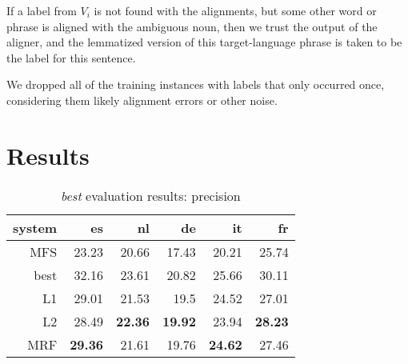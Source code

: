\documentclass[11pt,letterpaper]{article}
\begin{document}
If a label from $V_i$ is not found with the alignments, but some other word or
phrase is aligned with the ambiguous noun, then we trust the output of the
aligner, and the lemmatized version of this target-language phrase is taken to
be the label for this sentence.

We dropped all of the training instances with labels that only occurred once,
considering them likely alignment errors or other noise.


\section{Results}
\begin{table}[t!]
  \begin{center}
    \begin{tabular}{|r|r|r|r|r|r|}
      \hline
      system   & es    & nl    & de    &  it   & fr \\
      \hline
   MFS  & 23.23          & 20.66          & 17.43          & 20.21          & 25.74 \\
   best & 32.16          & 23.61          & 20.82          & 25.66          & 30.11 \\
      \hline
            L1 & 29.01          & 21.53          & 19.5           & 24.52          & 27.01 \\
            L2 & 28.49          & \textbf{22.36} & \textbf{19.92} & 23.94          & \textbf{28.23} \\
           MRF & \textbf{29.36} & 21.61          & 19.76          & \textbf{24.62} & 27.46 \\
      \hline
    \end{tabular}
  \caption{\emph{best} evaluation results: precision}
  \label{table:resultsbest}
  \end{center}
\end{table}
\end{document}
